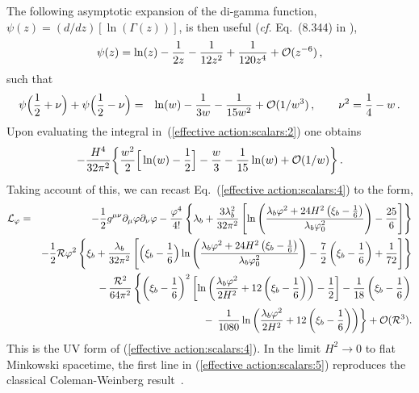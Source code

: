 \documentclass[aps,12pt,superscriptaddress,preprintnumbers,
                secnumarabic,nofootinbib,showpacs]{revtex4}
\begin{document}
The following asymptotic expansion of the di-gamma function,
$\psi(z) = (d/dz)[\ln(\Gamma(z))]$, is then useful ({\it cf.}
Eq.~(8.344) in \cite{GradshteynRyzhik:1965}),
\begin{equation}
  \psi(z) = \ln(z) - \frac{1}{2z} - \frac{1}{12z^2}
            + \frac{1}{120z^4} + {\cal O}(z^{-6})
\,,
\label{psi:asymptotic:0}
\end{equation}
such that
\begin{eqnarray}
 \psi\Big(\frac 12 + \nu\Big) + \psi\Big(\frac 12 - \nu\Big)
  &=& \ln(w) - \frac{1}{3w} - \frac{1}{15w^2} + {\cal O}(1/w^{3})
\,,\qquad \nu^2 = \frac14 - w
\,.
\label{psi:asymptotic expansion}
\end{eqnarray}
Upon evaluating the integral in~(\ref{effective action:scalars:2})
one obtains
\begin{equation}
 -\frac{H^4}{32\pi^2}
   \bigg\{
          \frac{w^2}{2}\Big[\ln(w)-\frac12\Big]
       -  \frac{w}{3}
       -  \frac{1}{15}\ln(w) + {\cal O}(1/w)
   \bigg\}
\,.
\end{equation}
Taking account of this, we can recast Eq.~(\ref{effective action:scalars:4})
to the form,
\begin{eqnarray}
 {\cal L}_\varphi
  &=& -\frac12g^{\mu\nu}\partial_\mu\varphi\partial_\nu\varphi
      - \frac{\varphi^4}{4!}\left\{\lambda_b+\frac{3\lambda_b^{2}}{32\pi^{2}}
      \left[\ln\left(\frac{\lambda_b\varphi^{2}+24H^{2}
      \left(\xi_b-\frac16\right)}{\lambda_b\varphi_0^{2}}\right)-\frac{25}{6}\right]\right\}
\nonumber\\
  & & -\frac12{\cal R}\varphi^2\left\{\xi_b+\frac{\lambda_b}{32\pi^{2}}\left[\Big(\xi_b-\frac16\Big)
                       \ln\left(\frac{\lambda_b\varphi^{2}+24H^{2}\left(\xi_b-\frac16\right)}{\lambda_b\varphi_0^{2}}\right)
                       -\frac72\left(\xi_b-\frac16\right)+\frac{1}{72}\right]\right\}
\label{effective action:scalars:5}
\nonumber\\
& &\hskip 0.cm
    -\, \frac{{\cal R}^2}{64\pi^2}
             \left\{
               \left(\xi_b-\frac16\right)^2
                   \left[\ln\left(\frac{\lambda_b\varphi^2}{2H^{2}}
                         +12\left(\xi_b-\frac16\right)\right)
                         -\frac12
                   \right]
             -\frac{1}{18}\left(\xi_b-\frac16\right)\right.
\nonumber\\
& &
             -\, \left.\frac{1}{1080}\ln\left(\frac{\lambda_b\varphi^2}{2H^{2}}
             +12\left(\xi_b-\frac16\right)\right)\right\}+{\cal O}({\cal R}^3).
\end{eqnarray}
This is the UV form of (\ref{effective action:scalars:4}). In the
limit $H^2\rightarrow 0$ to flat Minkowski spacetime, the first
line in (\ref{effective action:scalars:5}) reproduces the
classical Coleman-Weinberg result~\cite{ColemanWeinberg:1973}.
\end{document}

